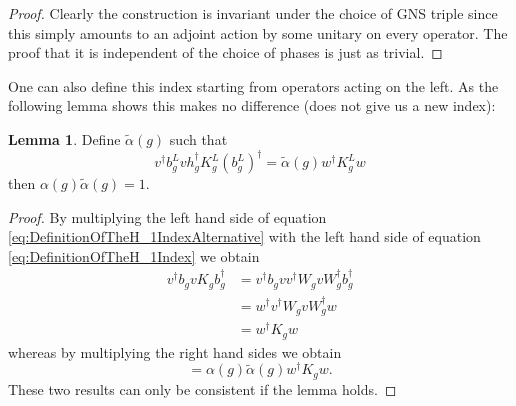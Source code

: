 \documentclass[12pt,a4paper,twoside]{article}
\theoremstyle{definition}
\newtheorem{lemma}[theorem]{Lemma}
\numberwithin{equation}{section}
\begin{document}
\begin{proof}
	Clearly the construction is invariant under the choice of GNS triple since this simply amounts to an adjoint action by some unitary on every operator. The proof that it is independent of the choice of phases is just as trivial.
\end{proof}
One can also define this index starting from operators acting on the left. As the following lemma shows this makes no difference (does not give us a new index):
\begin{lemma}
	Define $\tilde{\alpha}(g)$ such that
	\begin{equation}\label{eq:DefinitionOfTheH_1IndexAlternative}
		v^\dagger b_g^L v h_g^\dagger K_g^L (b_g^L)^\dagger=\tilde{\alpha}(g)w^\dagger K_g^L w
	\end{equation}
	then $\alpha(g)\tilde{\alpha}(g)=1$.
\end{lemma}
\begin{proof}
	By multiplying the left hand side of equation \eqref{eq:DefinitionOfTheH_1IndexAlternative} with the left hand side of equation \eqref{eq:DefinitionOfTheH_1Index} we obtain
	\begin{align}
		v^\dagger b_g v K_g b_g^\dagger&=v^\dagger b_g v v^\dagger W_g v W_g^\dagger b_g^\dagger\\
		&=w^\dagger v^\dagger W_g v W_g^\dagger w\\
		&=w^\dagger K_g w
	\end{align}
	whereas by multiplying the right hand sides we obtain
	\begin{equation}
		=\alpha(g)\tilde{\alpha}(g)w^\dagger K_g w.
	\end{equation}
	These two results can only be consistent if the lemma holds.
\end{proof}
\end{document}
